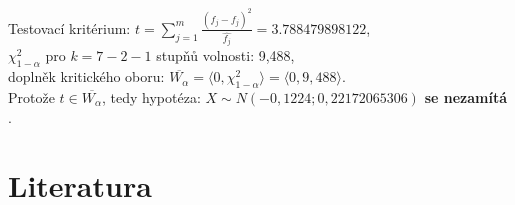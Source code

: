 \documentclass[11pt,a4paper]{article}
\begin{document}
Testovací kritérium: $ t = \sum\limits_{j=1}^{m} \frac{(f_j - \widehat{f_j})^2}{\widehat{f_j}} = 3.788479898122$, \\

$\chi_{1-\alpha}^2$ pro $ k = 7 - 2 - 1$ stupňů volnosti: 9,488, \\

doplněk kritického oboru: $ \overline{W_{\alpha}} = \langle 0, \chi_{1-\alpha}^2 \rangle = \langle 0, 9,488 \rangle$. \\

Protože $ t \in \overline{W_{\alpha}} $, tedy hypotéza: $ X \sim N(-0,1224; 0,22172065306) $ \textbf{se nezamítá} . \\









\newpage

\section{Literatura}

\begin{flushleft}
    
\end{flushleft}
\end{document}
